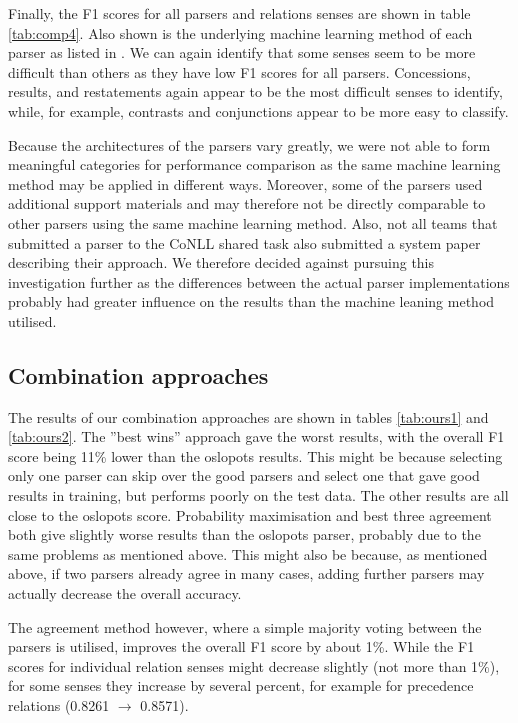 \documentclass[10pt,notitlepage]{scrartcl}
\begin{document}
Finally, the F1 scores for all parsers and relations senses are shown in table \ref{tab:comp4}. Also shown is the underlying machine learning method of each parser as listed in \cite{xue2016conll}. We can again identify that some senses seem to be more difficult than others as they have low F1 scores for all parsers. Concessions, results, and restatements again appear to be the most difficult senses to identify, while, for example, contrasts and conjunctions appear to be more easy to classify.

Because the architectures of the parsers vary greatly, we were not able to form meaningful categories for performance comparison as the same machine learning method may be applied in different ways. Moreover, some of the parsers used additional support materials and may therefore not be directly comparable to other parsers using the same machine learning method. Also, not all teams that submitted a parser to the CoNLL shared task also submitted a system paper describing their approach. We therefore decided against pursuing this investigation further as the differences between the actual parser implementations probably had greater influence on the results than the machine leaning method utilised.

\subsection*{Combination approaches}

The results of our combination approaches are shown in tables \ref{tab:ours1} and \ref{tab:ours2}. The ''best wins'' approach gave the worst results, with the overall F1 score being 11\% lower than the oslopots results. This might be because selecting only one parser can skip over the good parsers and select one that gave good results in training, but performs poorly on the test data. The other results are all close to the oslopots score. Probability maximisation and best three agreement both give slightly worse results than the oslopots parser, probably due to the same problems as mentioned above. This might also be because, as mentioned above, if two parsers already agree in many cases, adding further parsers may actually decrease the overall accuracy.

The agreement method however, where a simple majority voting between the parsers is utilised, improves the overall F1 score by about 1\%. While the F1 scores for individual relation senses might decrease slightly (not more than 1\%), for some senses they increase by several percent, for example for precedence relations (0.8261 $\rightarrow$ 0.8571).
\end{document}
